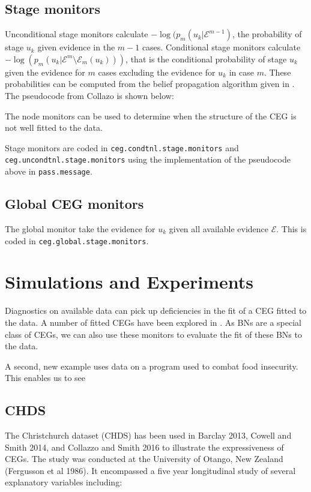 \documentclass[12pt]{article}
\begin{document}
 

\subsection{Stage monitors}
 
 Unconditional stage monitors calculate $-\log (p_m(u_k | \mathcal{E}^{m-1})$, the probability of stage $u_k$ given evidence in the $m-1$ cases. 
 Conditional stage monitors calculate $-\log (p_m(u_k | \mathcal{E}^m \setminus \mathcal{E}_m(u_k)))$, that is the conditional probability of stage $u_k$ given the evidence for $m$ cases excluding the evidence for $u_k$ in case $m$. These probabilities can be computed from the belief propagation algorithm given in \CEGBOOK. The pseudocode from Collazo is shown below:
 
 The node monitors can be used to determine when the structure of the CEG is not well fitted to the data.
 
 
 Stage monitors are coded in \texttt{ceg.condtnl.stage.monitors} and \texttt{ceg.uncondtnl.stage.monitors} using the implementation of the pseudocode above in \texttt{pass.message}.

 
 
\subsection{Global CEG monitors}

The global monitor take the evidence for $u_k$ given all available evidence $\mathcal{E}$. This is coded in \texttt{ceg.global.stage.monitors}. 


\section{Simulations and Experiments}

Diagnostics on available data can pick up deficiencies in the fit of a CEG fitted to the data. A number of fitted CEGs have been explored in \cite{CEGbook}. As BNs are a special class of CEGs, we can also use these monitors to evaluate the fit of these BNs to the data. 

A second, new example uses data on a program used to combat food insecurity. This enables us to see 


\subsection{CHDS}

The Christchurch dataset (CHDS) has been used in Barclay 2013, Cowell and Smith 2014, and Collazzo and Smith 2016 to illustrate the expressiveness of CEGs. The study was conducted at the University of Otango, New Zealand (Fergusson et al 1986). It encompassed a five year longitudinal study of several explanatory variables including: 
\end{document}
